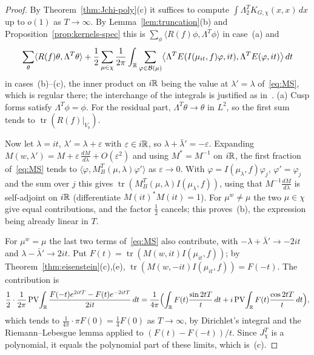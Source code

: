 \begin{proof}
By Theorem~\ref{thm:Jchi-poly}(c) it suffices to compute
$\int\Lambda^T_2K_{G,\chi}(x,x)\,dx$ up to $o(1)$ as $T\to\infty$. By
Lemma~\ref{lem:truncation}(b) and Proposition~\ref{prop:kernels-spec}
this is $\sum_\phi\langle R(f)\phi,\Lambda^T\phi\rangle$ in case~(a) and
\[
\sum_\theta\langle R(f)\theta,\Lambda^T\theta\rangle+\frac12\sum_{\mu\in\chi}
\frac1{2\pi}\int_{\mathbb{R}}\sum_{\varphi\in\mathcal B(\mu)}\bigl\langle\Lambda^T
E(I(\mu_{it},f)\varphi,it),\Lambda^TE(\varphi,it)\bigr\rangle\,dt
\]
in cases~(b)--(c), the inner product on $i\mathbb{R}$ being the value at
$\lambda'=\lambda$ of~\eqref{eq:MS}, which is regular there; the
interchange of the integrals is justified as in~\cite[\S4]{Ar80}. (a) Cusp
forms satisfy $\Lambda^T\phi=\phi$. For the residual part,
$\Lambda^T\theta\to\theta$ in $L^2$, so the first sum tends to
$\operatorname{tr}(R(f)|_{V_b})$.

Now let $\lambda=it$, $\lambda'=\lambda+\varepsilon$ with
$\varepsilon\in i\mathbb{R}$, so $\lambda+\bar\lambda'=-\varepsilon$. Expanding
$M(w,\lambda')=M+\varepsilon\,\frac{dM}{d\lambda}+O(\varepsilon^2)$ and
using $M^*=M^{-1}$ on $i\mathbb{R}$, the first fraction of~\eqref{eq:MS} tends to
$\langle\varphi,M_B^T(\mu,\lambda)\varphi'\rangle$ as $\varepsilon\to0$.
With $\varphi=I(\mu_\lambda,f)\varphi_j$, $\varphi'=\varphi_j$ and the sum
over $j$ this gives $\operatorname{tr}(M_B^T(\mu,\lambda)
I(\mu_\lambda,f))$, using that $M^{-1}\frac{dM}{d\lambda}$ is self-adjoint on
$i\mathbb{R}$ (differentiate $M(it)^*M(it)=1$). For $\mu^w\ne\mu$ the two $\mu\in
\chi$ give equal contributions, and the factor $\frac12$ cancels; this
proves~(b), the expression being already linear in $T$.

For $\mu^w=\mu$ the last two terms of~\eqref{eq:MS} also contribute, with
$-\lambda+\bar\lambda'\to-2it$ and $\lambda-\bar\lambda'\to2it$. Put
$F(t)=\operatorname{tr}(M(w,it)I(\mu_{it},f))$; by
Theorem~\ref{thm:eisenstein}(c),(e),
$\operatorname{tr}(M(w,-it)I(\mu_{it},f))=F(-t)$. The contribution is
\[
\frac12\cdot\frac1{2\pi}\,\mathrm{PV}\!\int_{\mathbb{R}}\frac{F(-t)e^{2itT}-F(t)
e^{-2itT}}{2it}\,dt
=\frac1{4\pi}\Bigl(\int_{\mathbb{R}} F(t)\frac{\sin2tT}{t}\,dt
+i\,\mathrm{PV}\!\int_{\mathbb{R}} F(t)\frac{\cos2tT}{t}\,dt\Bigr),
\]
which tends to $\frac1{4\pi}\cdot\pi F(0)=\frac14F(0)$ as $T\to\infty$, by
Dirichlet's integral and the Riemann--Lebesgue lemma applied to
$(F(t)-F(-t))/t$. Since $J^T_\chi$ is a polynomial, it equals the
polynomial part of these limits, which is~(c).
\end{proof}

